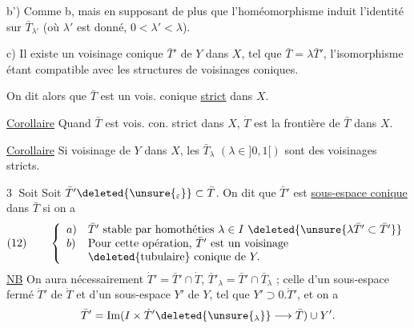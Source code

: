b') Comme b, mais en supposant de plus
que l'homéomorphisme induit l'identité
sur $\bar T_{\lambda'}$ (où 
$\lambda'$ est donné, $0<\lambda'<\lambda$).

c) Il existe un voisinage  conique $\bar T'$
de $Y$ dans $X$,  tel que $\bar T=\lambda\bar T'$,
l'isomorphisme étant compatible avec les
structures de voisinages coniques.

On dit alors que $\bar T$ est un vois.  conique
\uline{strict} dans $X$.


\uline{Corollaire} Quand $\bar T$ est vois.  con. strict dans $X$,
$\dot T$ est la frontière de $\bar T$ dans $X$.

\uline{Corollaire} Si  voisinage
 de $Y$
dans $X$, les $\bar T_\lambda$ $(\lambda\in]0,1[)$ sont des voisinages
 stricts.

\textcircled{3} Soit
Soit $\bar T'\deleted{\unsure{_\varepsilon}}\subset\bar T$.
On dit que $\bar T'$ est \uline{sous-espace conique} dans $\bar T$ si on a
\[
(12)\qquad\left\{\begin{array}{ll}
a)&\bar T'\text{ stable par homothéties }\lambda\in I\
\deleted{\unsure{\lambda\bar T'\subset\bar T'}}\\
b)&\text{Pour cette opération, }\bar T'\text{ est un voisinage}\\
&\deleted{\text{tubulaire}}\text{ conique de }Y.
\end{array}\right.
\]
\uline{NB} On aura nécessairement $\dot T'=\bar T'\cap\dot T$,
$\bar T'_\lambda=\bar T'\cap\bar T_\lambda$ ;
celle d'un sous-espace fermé $\dot T'$ de $\dot T$
et d'un sous-espace $Y'$ de $Y$, tel que $Y'\supset0.\dot T'$, et
on a
\[
\bar T'=\operatorname{Im}(I\times\dot T'
\deleted{\unsure{_\lambda}}\longrightarrow\bar T)\cup Y'.
\]


